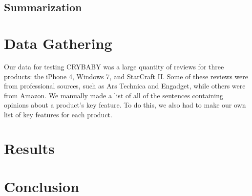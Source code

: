 \documentclass{article}
\begin{document}

\subsection{Summarization} %





\section{Data Gathering} %

Our data for testing CRYBABY was a large quantity of reviews for three products:  the iPhone 4, Windows 7, and StarCraft II.  Some of these reviews were from professional sources, such as Ars Technica and Engadget, while others were from Amazon.  We manually made a list of all of the sentences containing opinions about a product's key feature.  To do this, we also had to make our own list of key features for each product.


\section{Results} %




\section{Conclusion} %




\tocsection


\end{document}
